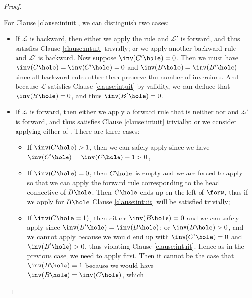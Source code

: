 \begin{proof}
\begin{enumerate}
\begin{itemize}
\begin{enumerate}
        For Clause \ref{clause:intuit}, we can distinguish two cases:
        \begin{itemize}
          \item If $\mathcal{L}$ is backward, then either we apply the
          {} rule and $\mathcal{L'}$ is forward, and thus
          satisfies Clause \ref{clause:intuit} trivially; or we apply another
          backward rule and $\mathcal{L'}$ is backward. Now suppose
          $\inv(C'\hole) = 0$. Then we must have $\inv(C\hole) = \inv(C'\hole) =
          0$ and $\inv(B\hole) = \inv(B'\hole)$ since all backward rules other
          than {} preserve the number of inversions. And
          because $\mathcal{L}$ satisfies Clause \ref{clause:intuit} by
          validity, we can deduce that $\inv(B\hole) = 0$, and thus
          $\inv(B'\hole) = 0$.
          \item If $\mathcal{L}$ is forward, then either we apply a forward rule
          that is neither {} nor {} and
          $\mathcal{L'}$ is forward, and thus satisfies Clause
          \ref{clause:intuit} trivially; or we consider applying either
          {} of {}. There are three cases:
          \begin{itemize}
            \item If $\inv(C\hole) > 1$, then we can safely apply
            {} since we have $\inv(C'\hole) = \inv(C\hole) - 1 >
            0$;
            \item If $\inv(C\hole) = 0$, then $C\hole$ is empty and we are
            forced to apply {} so that we can apply the forward
            rule corresponding to the head connective of $B\hole$. Then $C\hole$
            ends up on the left of $\forw$, thus if we apply
            {} for $B\hole$ Clause \ref{clause:intuit} will be
            satisfied trivially;
            \item If $\inv(C\hole = 1)$, then either $\inv(B\hole) = 0$ and we
            can safely apply {} since $\inv(B'\hole) =
            \inv(B\hole)$; or $\inv(B\hole) > 0$, and we cannot apply
            {} because we would end up with $\inv(C'\hole) =
            0$ and $\inv(B'\hole) > 0$, thus violating Clause
            \ref{clause:intuit}. Hence as in the previous case, we need to apply
            {} first. Then it cannot be the case that $\inv(B\hole)
            = 1$ because we would have $\inv(B\hole) = \inv(C\hole)$, which

\end{itemize}
\end{itemize}
\end{enumerate}
\end{itemize}
\end{enumerate}
\end{proof}
